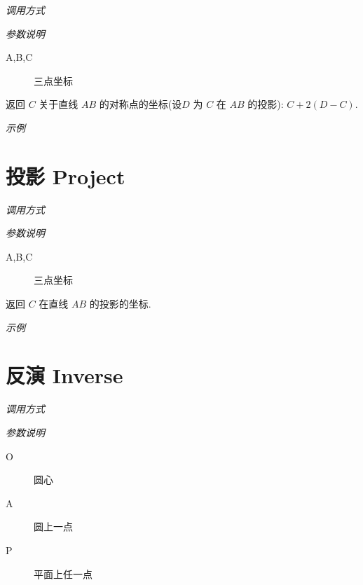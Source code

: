 \emph{调用方式}

\begin{tcolorbox}{}
\end{tcolorbox}

\emph{参数说明}

\begin{description}
  \item[A,B,C] 三点坐标
\end{description}

返回 $C$ 关于直线 $AB$ 的对称点的坐标(设$D$ 为 $C$ 在 $AB$ 的投影): $C+2(D-C)$.

\emph{示例}


\section{投影 Project}

\emph{调用方式}

\begin{tcolorbox}{}
\end{tcolorbox}

\emph{参数说明}

\begin{description}
  \item[A,B,C] 三点坐标
\end{description}

返回 $C$ 在直线 $AB$ 的投影的坐标.

\emph{示例}


\section{反演 Inverse}

\emph{调用方式}

\begin{tcolorbox}{}
\end{tcolorbox}

\emph{参数说明}

\begin{description}
  \item[O] 圆心
  \item[A] 圆上一点
  \item[P] 平面上任一点 
\end{description}

